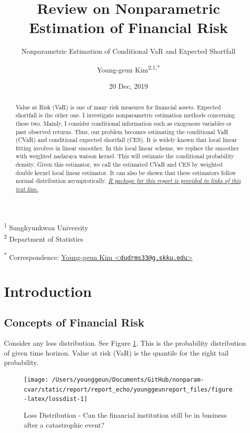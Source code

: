 \documentclass[
]{article}
\title{Review on Nonparametric Estimation of Financial Risk}
\subtitle{Nonparametric Estimation of Conditional VaR and Expected Shortfall}
\author{Young-geun Kim\textsuperscript{2,1,*}}
\date{20 Dec, 2019}
\theoremstyle{definition}
\theoremstyle{definition}
\theoremstyle{definition}
\theoremstyle{remark}
\begin{document}
\maketitle
\begin{abstract}
Value at Risk (VaR) is one of many risk measures for financial assets. Expected shortfall is the other one. I investigate nonparametric estimation methods concerning these two. Mainly, I consider conditional information such as exogenous variables or past observed returns. Thus, our problem becomes estimating the conditional VaR (CVaR) and conditional expected shortfall (CES). It is widely known that local linear fitting involves in linear smoother. In this local linear scheme, we replace the smoother with weighted nadaraya watson kernel. This will estimate the conditional probability density. Given this estimator, we call the estimated CVaR and CES by weighted double kernel local linear estimator. It can also be shown that these estimators follow normal distribution asymptotically. \href{https://github.com/ygeunkim/ceshat}{\emph{R package for this report is provided in links of this text line}.}
\end{abstract}

\textsuperscript{1} Sungkyunkwan University\\
\textsuperscript{2} Department of Statistics

\textsuperscript{*} Correspondence: \href{mailto:dudrms33@g.skku.edu}{Young-geun Kim \textless{}\href{mailto:dudrms33@g.skku.edu}{\nolinkurl{dudrms33@g.skku.edu}}\textgreater{}}

\hypertarget{introduction}{%
\section{Introduction}\label{introduction}}

\hypertarget{concepts-of-financial-risk}{%
\subsection{Concepts of Financial Risk}\label{concepts-of-financial-risk}}

Consider any loss distribution. See Figure \ref{fig:lossdist}. This is the probability distribution of given time horizon. Value at risk (VaR) is the quantile for the right tail probability.

\begin{figure}[H]

{\centering \texttt{[image: /Users/younggeun/Documents/GitHub/nonparam-cvar/static/report/report\_echo/younggeunreport\_files/figure-latex/lossdist-1]} 

}

\caption{Loss Distribution - Can the financial institution still be in business after a catastrophic event?}\label{fig:lossdist}
\end{figure}
\end{document}
